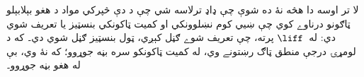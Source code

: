 \documentclass[../../../include/open-logic-chapter]{subfiles}
\begin{document}
      {}
      {}

\begin{editorial}
  لا تر اوسه دا هڅه نۀ ده شوې چې ډاډ ترلاسه شي چې د دې څپرکي مواد
  د هغو بېلابېلو ټاګونو درناوے کوي چې ښيي کوم نښلوونکي او کميت
  ټاکونکي بنسټيز يا تعريف شوي دي: له~$\liff$ پرته، چې تعريف شوے
  ګڼل کېږي، ټول بنسټيز ګڼل شوي دي۔ که د لومړۍ درجې منطق ټاګ رښتونے
  وي، له کميت ټاکونکو سره بڼه جوړوو؛ که نۀ وي، بې له هغو بڼه جوړوو۔
\end{editorial}














\OLEndChapterHook
\end{document}

